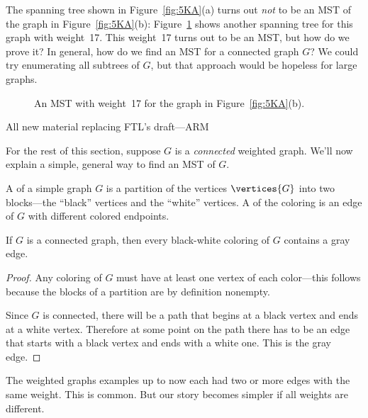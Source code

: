 The spanning tree shown in Figure~\ref{fig:5KA}(a) turns out
\emph{not} to be an MST of the graph in Figure~\ref{fig:5KA}(b):
Figure~\ref{fig:5KB} shows another spanning tree for this graph with
weight~17.  This weight~17 turns out to be an MST, but how do we prove
it?  In general, how do we find an MST for a connected graph $G$?  We
could try enumerating all subtrees of $G$, but that approach would be
hopeless for large graphs.

\begin{figure}
\caption{An MST with weight~17 for the graph in
  Figure~\ref{fig:5KA}(b).}
\label{fig:5KB}
\end{figure}

\begin{editingnotes}
All new material replacing FTL's draft---ARM
\end{editingnotes}

For the rest of this section, suppose $G$ is a \emph{connected}
weighted graph.  We'll now explain a simple, general way to find an
MST of $G$.

\begin{definition}
A  of a simple
graph $G$ is a partition of the vertices $\vertices{G}$ into two
blocks---the ``black'' vertices and the ``white'' vertices.  A
 of the coloring is an edge of $G$ with different
colored endpoints.
\end{definition}

\begin{lemma}\label{lem:enough-gray}
If $G$ is a connected graph, then every black-white coloring of $G$
contains a gray edge.
\end{lemma}

\begin{proof}
Any coloring of $G$ must have at least one vertex of each color---this
follows because the blocks of a partition are by definition nonempty.

Since $G$ is connected, there will be a path that begins at a black
vertex and ends at a white vertex.  Therefore at some point on the
path there has to be an edge that starts with a black vertex and ends
with a white one.  This is the gray edge.
\end{proof}

The weighted graphs examples up to now each had two or more edges with
the same weight.  This is common.  But our story becomes simpler if
all weights are different.

